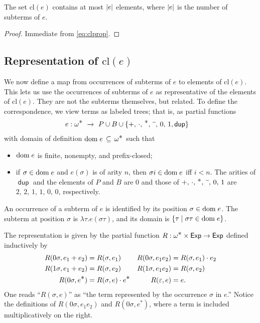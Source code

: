 \documentclass{article}
\newcommand\pdup{\mathop{\mathsf{dup}}}
\newcommand\Exp{\mathsf{Exp}}
\renewcommand\star{^{\textstyle *}}
\newcommand\clname{\mathrm{cl}}
\newcommand\cl[1]{\clname(#1)}
\begin{document}
\begin{lemma}
\label{eq:derivlinear}
The set $\cl e$ contains at most $|e|$ elements, where $|e|$ is the
number of subterms of $e$.
\end{lemma}
\begin{proof}
Immediate from \eqref{eq:clprop}.
\end{proof}

\subsection*{Representation of $\cl e$}

\newcommand\repname{R}
\newcommand\rep[2]{\repname(#1,#2)}

We now define a map from occurrences of subterms of $e$ to elements of $\cl e$. This lets us use the occurrences of subterms of $e$ as representative of the elements of $\cl e$. They are not the subterms themselves, but related. To define the correspondence, we view terms as labeled trees; that is, as partial functions
\begin{align*}
e:\omega\star\ &\imp\ P\cup B\cup\{+,\,\cdot,\,\star,\,\barnone,\,0,\,1,\pdup\}
\end{align*}
with domain of definition $\dom e\subs\omega\star$ such that
\begin{itemize}
\item 
${\rm dom\;}e$ is finite, nonempty, and prefix-closed;
\item
if $\sigma\in{\rm dom\;}e$ and $e(\sigma)$ is of arity $n$, then $\sigma i\in{\rm dom\;}e$ iff $i < n$.  The arities of $\pdup$ and the elements of $P$ and $B$ are $0$ and those of $+,\,\cdot,\,\star,\,\barnone,\,0,\,1$ are $2,\,2,\,1,\,1,\,0,\,0$, respectively.
\end{itemize}
An occurrence of a subterm of $e$ is identified by its position $\sigma\in{\rm dom\;}e$.  The subterm at position $\sigma$ is $\lambda\tau.e(\sigma\tau)$, and its domain is $\{\tau \mid \sigma\tau\in{\rm dom\;}e\}$.

The representation is given by the partial function $\repname:\omega\star\times\Exp\imp\Exp$ defined inductively by
\begin{align*}
\rep{0\sigma}{e_1+e_2} &= \rep\sigma{e_1} & \rep{0\sigma}{e_1e_2} &= \rep\sigma{e_1}\cdot e_2\\
\rep{1\sigma}{e_1+e_2} &= \rep\sigma{e_2} & \rep{1\sigma}{e_1e_2} &= \rep\sigma{e_2}\\
\rep{0\sigma}{e\star} &= \rep\sigma e\cdot e\star & \rep\eps e &= e.
\end{align*}
One reads ``$\rep\sigma e$'' as ``the term represented by the occurrence $\sigma$ in $e$.''
Notice the definitions of $\rep{0\sigma}{e_1e_2}$ and $\rep{0\sigma}{e\star}$, where a term is included multiplicatively on the right.
\end{document}
